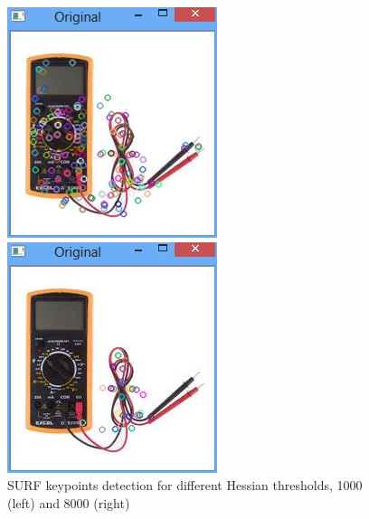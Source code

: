 \documentclass[journal,twoside]{IEEEtran}
\begin{document}
\begin{figure}[!b]
    \begin{minipage}[t]{.45\linewidth}
        \includegraphics[width=\linewidth]{figure1a}
    \end{minipage}%
        \hfill%
    \begin{minipage}[t]{.45\linewidth}
        \includegraphics[width=\linewidth]{figure1b}
    \end{minipage}%
    \caption{SURF keypoints detection for different Hessian thresholds, 1000 (left) and 8000 (right)}
    \label{fig:figure1}
\end{figure}
\end{document}
